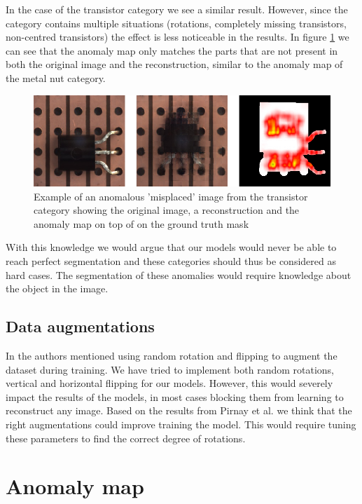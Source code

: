 In the case of the transistor category we see a similar result. However, since the category contains multiple situations (rotations, completely missing transistors, non-centred transistors) the effect is less noticeable in the results. In figure \ref{fig:discussion:transistor-anomap} we can see that the anomaly map only matches the parts that are not present in both the original image and the reconstruction, similar to the anomaly map of the metal nut category.

\begin{figure}[ht!]
\centering
\includegraphics[width=\textwidth]{imgs/samples/transistor_misplaced_anomap.jpg}
\caption{Example of an anomalous 'misplaced' image from the transistor category showing the original image, a reconstruction and the anomaly map on top of on the ground truth mask}
\label{fig:discussion:transistor-anomap}
\end{figure}

With this knowledge we would argue that our models would never be able to reach perfect segmentation and these categories should thus be considered as hard cases. The segmentation of these anomalies would require knowledge about the object in the image.

\subsection{Data augmentations}

In \cite{pirnay_inpainting_2021} the authors mentioned using random rotation and flipping to augment the dataset during training. We have tried to implement both random rotations, vertical and horizontal flipping for our models. However, this would severely impact the results of the models, in most cases blocking them from learning to reconstruct any image. Based on the results from Pirnay et al. we think that the right augmentations could improve training the model. This would require tuning these parameters to find the correct degree of rotations.

\section{Anomaly map}

